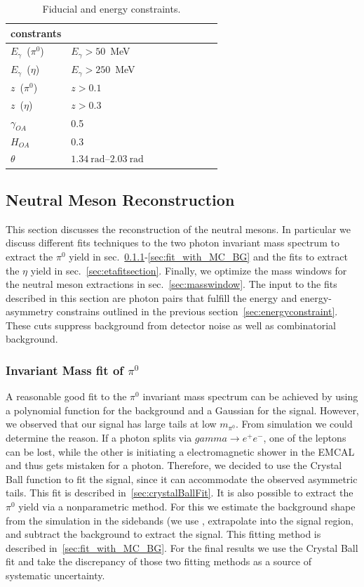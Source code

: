 \begin{table}[H]\small
\centering
\begin{tabular}{|l|l|l|l|l|l|l|l|l|}
\hline
constrants &   \\ \hline
$E_\gamma$~($\pi^0$) & $E_\gamma >50$~MeV \\ \hline
$E_\gamma$~($\eta$) & $E_\gamma >250$~MeV \\ \hline
$z$~($\pi^0$) & $z>0.1$ \\ \hline
$z$~($\eta$) & $z>0.3$ \\ \hline
$\gamma_{OA}$ & 0.5 \\ \hline
$H_{OA}$ & 0.3 \\ \hline
$\theta$ &  $1.34~\text{rad}$\textup{--}$ 2.03~\text{rad}$ \\ \hline
\end{tabular}
\caption{Fiducial and energy constraints.}
\label{tab:constrain}
\end{table}

\subsection{Neutral Meson Reconstruction}
\label{sec:neutralmesonreconstruction}
This section discusses the reconstruction of the neutral mesons. In particular we discuss different fits techniques to the two photon invariant mass spectrum to extract the $\pi^0$ yield in sec.~\ref{sec:pi0fitsection}-\ref{sec:fit_with_MC_BG} and the fits to extract the $\eta$ yield in sec.~\ref{sec:etafitsection}. Finally, we optimize the mass windows for the neutral meson extractions in sec.~\ref{sec:masswindow}. The input to the fits described in this section are photon pairs that fulfill the energy and energy-asymmetry constrains outlined in the previous section~\ref{sec:energyconstraint}. 
These cuts suppress background from detector noise as well as combinatorial background.

\subsubsection{\texorpdfstring{Invariant Mass fit of $\pi^0$}{pi0 fit}}
\label{sec:pi0fitsection}
A reasonable good fit to the $\pi^0$ invariant mass spectrum can be achieved by using a polynomial function for the background and a Gaussian for the signal. However, we observed that our signal has large tails at low $m_{\pi^0}$. From simulation we could determine the reason. If a photon splits via  $gamma\rightarrow e^+e^-$, one of the leptons can be lost, while the other is initiating a electromagnetic shower in the EMCAL and thus gets mistaken for a photon.
 Therefore, we decided to use the Crystal Ball function to fit the signal, since it can accommodate the observed asymmetric tails.  This fit is described in~\ref{sec:crystalBallFit}.
 It is also possible to extract the $\pi^0$ yield via a nonparametric method. For this we estimate the background shape from the simulation in the sidebands (we use , extrapolate into the signal region, and subtract the background to extract the signal.  This fitting method is described in~\ref{sec:fit_with_MC_BG}.
For the final results we use the Crystal Ball fit and take the discrepancy of those two fitting methods as a source of systematic uncertainty.

